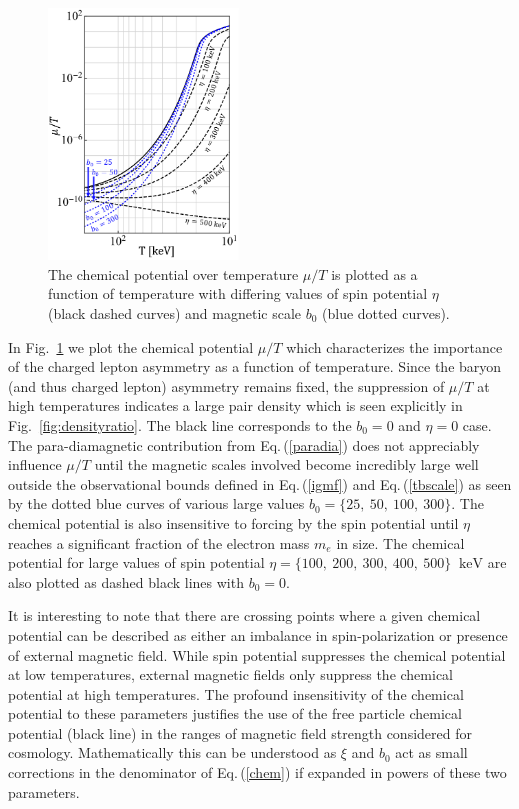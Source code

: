 \documentclass[reprint]{revtex4-2}
\newcommand*{\keV}{\text{ keV}}
\newcommand{\req}[1]{Eq.\,(\ref{#1})}
\newcommand{\rf}[1]{Fig.~{\ref{#1}}}
\begin{document}
\begin{figure}[ht]
    \centering
    \includegraphics[width=0.45\textwidth]{plots/ChemicalPotential_05.png}
    \caption{The chemical potential over temperature $\mu/T$ is plotted as a function of temperature with differing values of spin potential $\eta$ (black dashed curves) and magnetic scale $b_{0}$ (blue dotted curves).}
    \label{fig:chemicalpotential}
\end{figure}

In \rf{fig:chemicalpotential} we plot the chemical potential $\mu/T$ which characterizes the importance of the charged lepton asymmetry as a function of temperature. Since the baryon (and thus charged lepton) asymmetry remains fixed, the suppression of $\mu/T$ at high temperatures indicates a large pair density which is seen explicitly in \rf{fig:densityratio}. The black line corresponds to the $b_{0}=0$ and $\eta=0$ case. The para-diamagnetic contribution from \req{paradia} does not appreciably influence $\mu/T$ until the magnetic scales involved become incredibly large well outside the observational bounds defined in \req{igmf} and \req{tbscale} as seen by the dotted blue curves of various large values $b_{0}=\{25,\ 50,\ 100,\ 300\}$. The chemical potential is also insensitive to forcing by the spin potential until $\eta$ reaches a significant fraction of the electron mass $m_{e}$ in size. The chemical potential for large values of spin potential $\eta=\{100,\ 200,\ 300,\ 400,\ 500\}\ \keV$ are also plotted as dashed black lines with $b_{0}=0$.

It is interesting to note that there are crossing points where a given chemical potential can be described as either an imbalance in spin-polarization or presence of external magnetic field. While spin potential suppresses the chemical potential at low temperatures, external magnetic fields only suppress the chemical potential at high temperatures. The profound insensitivity of the chemical potential to these parameters justifies the use of the free particle chemical potential (black line) in the ranges of magnetic field strength considered for cosmology. Mathematically this can be understood as $\xi$ and $b_{0}$ act as small corrections in the denominator of \req{chem} if expanded in powers of these two parameters.
\end{document}
